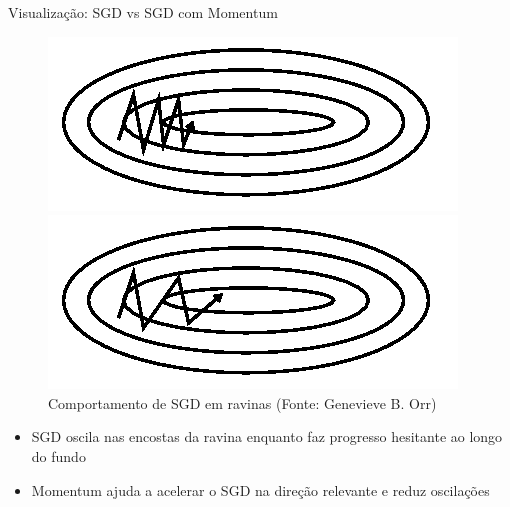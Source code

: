 \documentclass[aspectratio=1610]{beamer}
\begin{document}
\begin{frame}{Visualização: SGD vs SGD com Momentum}
\begin{figure}
\centering
\begin{minipage}{0.45\textwidth}
    \centering
    \includegraphics[width=\textwidth]{figures/without_momentum.png}
    \caption{SGD sem momentum}
\end{minipage}%
\hfill
\begin{minipage}{0.45\textwidth}
    \centering
    \includegraphics[width=\textwidth]{figures/with_momentum.png}
    \caption{SGD com momentum}
\end{minipage}
\caption{Comportamento de SGD em ravinas (Fonte: Genevieve B. Orr)}
\end{figure}

\begin{itemize}
    \item SGD oscila nas encostas da ravina enquanto faz progresso hesitante ao longo do fundo
    \item Momentum ajuda a acelerar o SGD na direção relevante e reduz oscilações
\end{itemize}
\end{frame}
\end{document}

